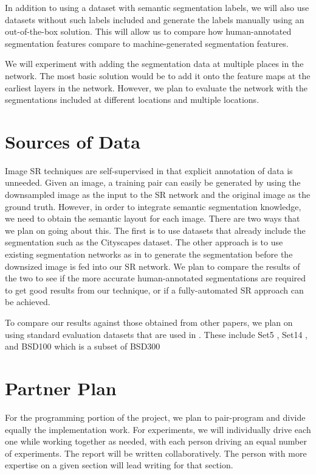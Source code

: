 \documentclass[10pt,twocolumn,letterpaper]{article}
\begin{document}
In addition to using a dataset with semantic segmentation labels, we will also
use datasets without such labels included and generate the labels manually
using an out-of-the-box solution. This will allow us to compare how
human-annotated segmentation features compare to machine-generated segmentation
features.

We will experiment with adding the segmentation data at multiple places in the
network. The most basic solution would be to add it onto the feature maps at
the earliest layers in the network. However, we plan to evaluate the network
with the segmentations included at different locations and multiple locations.


\section{Sources of Data}
Image SR techniques are self-supervised in that explicit annotation of data is
unneeded. Given an image, a training pair can easily be generated by using the
downsampled image as the input to the SR network and the original image as the
ground truth. However, in order to integrate semantic segmentation knowledge,
we need to obtain the semantic layout for each image. There are two ways that we
plan on going about this. The first is to use datasets that already include
the segmentation such as the Cityscapes \cite{Cityscapes} dataset. The other
approach is to use existing segmentation networks as in
\cite{FullyConvolutionalSS} to generate the segmentation before the downsized
image is fed into our SR network. We plan to compare the results of the two to
see if the more accurate human-annotated segmentations are required to get good
results from our technique, or if a fully-automated SR approach can be achieved.

To compare our results against those obtained from other papers, we plan on
using standard evaluation datasets that are used in \cite{SRGAN}. These include
Set5 \cite{Set5}, Set14 \cite{Set14}, and BSD100 which is a subset of
BSD300 \cite{BSD300}


\section{Partner Plan}
For the programming portion of the project, we plan to pair-program and
divide equally the implementation work. For experiments, we will individually
drive each one while working together as needed, with each person driving an
equal number of experiments. The report will be written collaboratively. The
person with more expertise on a given section will lead writing for that
section.
\end{document}
